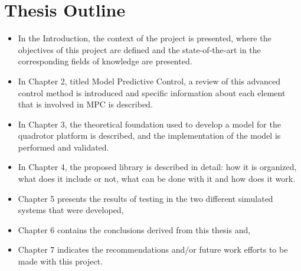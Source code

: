 \section{Thesis Outline}


\begin{itemize} \itemsep0pt
\item[] In the Introduction, the context of the project is presented, where the objectives of this project are defined and the state-of-the-art in the corresponding fields of knowledge are presented. 
\item[] In Chapter 2, titled Model Predictive Control, a review of this advanced control method is introduced and specific information about each element that is involved in MPC is described. 
\item[] In Chapter 3, the theoretical foundation used to develop a model for the quadrotor platform is described, and the implementation of the model is performed and validated. 
\item[] In Chapter 4, the proposed library is described in detail: how it is organized, what does it include or not, what can be done with it and how does it work. 
\item[] Chapter 5 presents the results of testing in the two different simulated systems that were developed, 
\item[] Chapter 6 contains the conclusions derived from this thesis and,
\item[] Chapter 7 indicates the recommendations and/or future work efforts to be made with this project.  
\end{itemize}
 	




 
